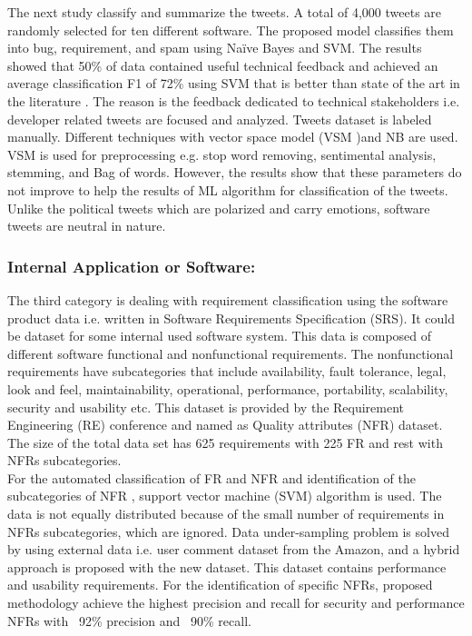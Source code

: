 	The next study \cite{williams2017} classify and summarize the tweets. A total of 
4,000 tweets are randomly selected for ten different software. The proposed model
classifies them into bug, requirement, and spam using Naïve Bayes and SVM. The results
showed that 50\% of data contained useful technical feedback and achieved an average
classification F1 of 72\% using SVM that is better than state of the art in the literature  \cite{guzman2017}. The
reason is the feedback dedicated to technical stakeholders i.e. developer related tweets are
focused and analyzed. Tweets dataset is labeled manually. Different techniques with vector space model (VSM )and
NB are used. VSM is used for preprocessing e.g. stop word removing, sentimental analysis, stemming,
and Bag of words. However, the results show that these parameters do not
improve to help the results of ML algorithm for classification of the tweets. Unlike the political
tweets which are polarized and carry emotions, software tweets are neutral in nature.\\

\subsubsection{Internal Application or Software: }
The third category is dealing with requirement classification using the software product data
i.e. written in Software Requirements Specification (SRS). It could be dataset for some internal used software system. This data is composed of different software functional and nonfunctional
requirements.  The nonfunctional requirements have subcategories that include availability,
fault tolerance, legal, look and feel, maintainability, operational, performance, portability,
scalability, security and usability etc. This dataset is provided by the Requirement Engineering
(RE) conference and named as Quality attributes (NFR) dataset. The size of the total data set
has 625 requirements with 225 FR and rest with NFRs subcategories. \\

	For the automated classification of FR and NFR and identification of the subcategories of NFR \cite{kurtanovic2017}, support
vector machine (SVM) algorithm is used. The data is not equally distributed because of the small
number of requirements in NFRs subcategories, which are ignored. Data
under-sampling problem is solved by using external data i.e. user comment
dataset from the Amazon, and a hybrid approach is proposed with the new dataset. This
dataset contains performance and usability requirements. For the identification of specific
NFRs, proposed methodology achieve the highest precision and recall for security and
performance NFRs with ~92\% precision and ~90\% recall. \\

